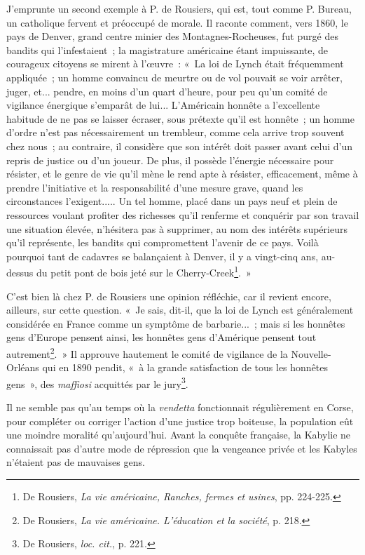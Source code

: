 \documentclass[french,twoside]{book} %
\begin{document}
 J’emprunte un second exemple à P. de Rousiers, qui est, tout comme P. Bureau, un catholique fervent et préoccupé de morale. Il raconte comment, vers 1860, le pays de Denver, grand centre minier des Montagnes-Rocheuses, fut purgé des bandits qui l’infestaient ; la magistrature américaine étant impuissante, de courageux citoyens se mirent à l’œuvre : « La loi de Lynch était fréquemment appliquée ; un homme convaincu de meurtre ou de vol pouvait se voir arrêter, juger, et... pendre, en moins d’un quart d’heure, pour peu qu’un comité de vigilance énergique s’emparât de lui... L’Américain honnête a l’excellente habitude de ne pas se laisser écraser, sous prétexte qu’il est honnête ; un homme d’ordre n’est pas nécessairement un trembleur, comme cela arrive trop souvent chez nous ; au contraire, il considère que son intérêt doit passer avant celui d’un repris de justice ou d’un joueur. De plus, il possède l’énergie nécessaire pour résister, et le genre de vie qu’il mène le rend apte à résister, efficacement, même à prendre l’initiative et la responsabilité d’une mesure grave, quand les circonstances l’exigent..... Un tel homme, placé dans un pays neuf et plein de ressources voulant profiter des richesses qu’il renferme et conquérir par son travail une situation élevée, n’hésitera pas à supprimer, au nom des intérêts supérieurs qu’il représente, les bandits qui compromettent l’avenir de ce pays. Voilà pourquoi tant de cadavres se balançaient à Denver, il y a vingt-cinq ans, au-dessus du petit pont de bois jeté sur le Cherry-Creek\footnote{ \noindent De Rousiers, \emph{La vie américaine, Ranches, fermes et usines}, pp. 224-225.
 }. »\par
 C’est bien là chez P. de Rousiers une opinion réfléchie, car il revient encore, ailleurs, sur cette question. « Je sais, dit-il, que la loi de Lynch est généralement considérée en France comme un symptôme de barbarie... ; mais si les honnêtes gens d’Europe pensent ainsi, les honnêtes gens d’Amérique pensent tout autrement\footnote{ \noindent De Rousiers, \emph{La vie américaine. L’éducation et la société}, p. 218.
 }. » Il approuve hautement le comité de vigilance de la Nouvelle-Orléans qui en 1890 pendit, « à la grande satisfaction de tous les honnêtes gens », des \emph{maffiosi} acquittés par le jury\footnote{ \noindent De Rousiers, \emph{loc. cit.}, p. 221.
 }.\par
Il ne semble pas qu’au temps où la \emph{vendetta} fonctionnait régulièrement en Corse, pour compléter ou corriger l’action d’une justice trop boiteuse, la population eût une moindre moralité qu’aujourd’hui. Avant la conquête française, la Kabylie ne connaissait pas d’autre mode de répression que la vengeance privée et les Kabyles n’étaient pas de mauvaises gens.\par
\end{document}
